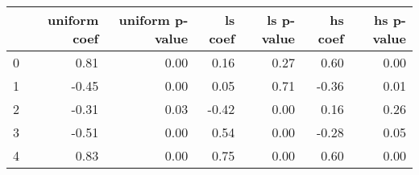 \begin{tabular}{lrrrrrr}
\toprule
 & uniform coef & uniform p-value & ls coef & ls p-value & hs coef & hs p-value \\
\midrule
0 & 0.81 & 0.00 & 0.16 & 0.27 & 0.60 & 0.00 \\
1 & -0.45 & 0.00 & 0.05 & 0.71 & -0.36 & 0.01 \\
2 & -0.31 & 0.03 & -0.42 & 0.00 & 0.16 & 0.26 \\
3 & -0.51 & 0.00 & 0.54 & 0.00 & -0.28 & 0.05 \\
4 & 0.83 & 0.00 & 0.75 & 0.00 & 0.60 & 0.00 \\
\bottomrule
\end{tabular}

